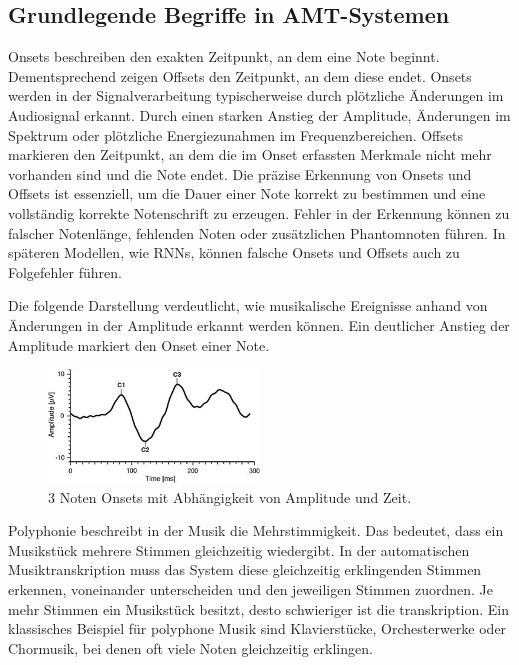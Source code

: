\subsection{Grundlegende Begriffe in AMT-Systemen}
\begin{description}[style=nextline]
\item[Onsets und Offsets]\label{itm:onset_offset}
Onsets beschreiben den exakten Zeitpunkt, an dem eine Note beginnt.
Dementsprechend zeigen Offsets den Zeitpunkt, an dem diese endet.
Onsets werden in der Signalverarbeitung typischerweise durch plötzliche Änderungen im Audiosignal erkannt.
Durch einen starken Anstieg der Amplitude, Änderungen im Spektrum oder plötzliche Energiezunahmen im Frequenzbereichen.
Offsets markieren den Zeitpunkt, an dem die im Onset erfassten Merkmale nicht mehr vorhanden sind und die Note endet.
Die präzise Erkennung von Onsets und Offsets ist essenziell,
um die Dauer einer Note korrekt zu bestimmen und eine vollständig korrekte Notenschrift zu erzeugen.
Fehler in der Erkennung können zu falscher Notenlänge, fehlenden Noten oder zusätzlichen Phantomnoten führen.
In späteren Modellen, wie RNNs, können falsche Onsets und Offsets auch zu Folgefehler führen.

Die folgende Darstellung verdeutlicht,
wie musikalische Ereignisse anhand von Änderungen in der Amplitude erkannt werden können.
Ein deutlicher Anstieg der Amplitude markiert den Onset einer Note.
\begin{figure}[H]
    \centering
    \includegraphics[width=0.5\textwidth]{Graphics/Onset_detection}
    \caption[Noten Onsets]{3 Noten Onsets mit Abhängigkeit von Amplitude und Zeit\cite{brown2016patternvep}.}
    \label{fig:onsets}
\end{figure}
\end{description}

\begin{description}[style=nextline]
\item[Polyphonie]\label{itm:polyphonie}
Polyphonie beschreibt in der Musik die Mehrstimmigkeit.
Das bedeutet, dass ein Musikstück mehrere Stimmen gleichzeitig wiedergibt.
In der automatischen Musiktranskription muss das System diese gleichzeitig erklingenden Stimmen erkennen, voneinander unterscheiden und den jeweiligen Stimmen zuordnen.
Je mehr Stimmen ein Musikstück besitzt, desto schwieriger ist die transkription.
Ein klassisches Beispiel für polyphone Musik sind Klavierstücke, Orchesterwerke oder Chormusik, bei denen oft viele Noten gleichzeitig erklingen.
\end{description}

